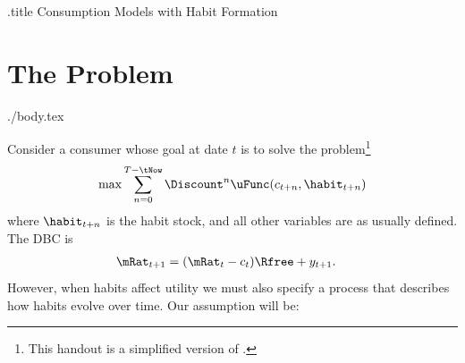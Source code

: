 \documentclass{handout}
\begin{document}
\handoutHeader


\begin{verbatimwrite}{\jobname.title}
Consumption Models with Habit Formation
\end{verbatimwrite}

\handoutNameMake




\section{The Problem}
\begin{verbatimwrite}{./body.tex}

Consider a consumer whose goal at date $t$ is to solve the problem\footnote{This handout is a simplified version of \cite{carroll:solvinghabits}.}
\begin{equation}
        \max \sum_{n=0}^{T-\tNow} \Discount^{n} \uFunc(c_{t+n},\habit_{t+n})
\end{equation}
where $\habit_{t+n}$ is the habit stock, and all other variables are as
usually defined.  The DBC is 
\begin{equation}\begin{gathered}\begin{aligned}
 \mRat_{t+1} & =  (\mRat_{t}-c_{t})\Rfree + y_{t+1}. \label{eq:xaccum}
\end{aligned}\end{gathered}\end{equation}
However, when habits affect utility we must also specify a process 
that describes how habits evolve over time.  Our assumption will be: 


\end{verbatimwrite}
\end{document}
